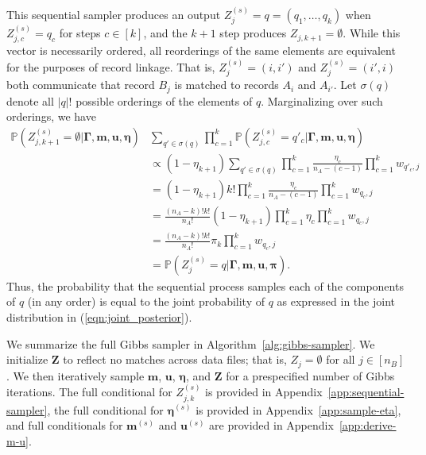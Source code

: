 \documentclass[12pt,letterpaper]{article}
\newcommand{\1}[1]{\mathbb{I}\!\left[#1\right]} %
\begin{document}
This sequential sampler produces an output $Z_j^{(s)} = q = (q_1, \ldots, q_k)$ when $Z_{j, c}^{(s)} = q_c$ for steps $c \in [k]$, and the $k+1$ step produces $Z_{j, k+1} = \emptyset$. While this vector is necessarily ordered, all reorderings of the same elements are equivalent for the purposes of record linkage.   That is, $Z_j^{(s)} = (i, i')$ and $Z_j^{(s)} = (i', i)$ both communicate that record $B_j$ is matched to records $A_i$ and $A_{i'}$. Let $\sigma(q)$ denote all $|q|!$ possible orderings of the elements of $q$. Marginalizing over such orderings, we have
\begin{align*}
	\mathbb{P}(Z_{j, k+1}^{(s)} = \emptyset | \bm{\Gamma}, \bm{m}, \bm{u}, \bm{\eta}) &\sum_{q' \in \sigma(q)} \prod_{c = 1}^{k} \mathbb{P}(Z_{j, c}^{(s)} = q'_c|\bm{\Gamma}, \bm{m}, \bm{u}, \bm{\eta}) \\
	&\propto (1 - \eta_{k+1}) \sum_{q' \in \sigma(q)} \prod_{c = 1}^{k} \frac{\eta_{c} }{n_A - (c - 1)}  \prod_{c = 1}^{k} w_{q'_c, j} \\
	&=(1 - \eta_{k+1}) k! \prod_{c = 1}^{k} \frac{\eta_{c} }{n_A - (c - 1)}  \prod_{c = 1}^{k} w_{q_c, j} \\
	&= \frac{(n_A - k)!k!}{n_A!} (1 - \eta_{k+1})\prod_{c = 1}^{k} \eta_{c} \prod_{c = 1}^{k} w_{q_c, j} \\
	&= \frac{(n_A - k)!k!}{n_A!} \pi_k \prod_{c = 1}^{k} w_{q_c, j} \\
	&= \mathbb{P}\left(Z_j^{(s)}  = q |\bm{\Gamma}, \bm{m}, \bm{u}, \bm{\pi}\right).
\end{align*}
Thus, the probability that the sequential process samples each of the components of $q$ (in any order) is equal to the joint probability of $q$ as expressed in the joint distribution in (\ref{eqn:joint_posterior}).

We summarize the full Gibbs sampler in Algorithm~\ref{alg:gibbs-sampler}. We initialize $\bm{Z}$ to reflect no matches across data files; that is, $Z_j = \emptyset$ for all $j \in [n_B]$. We then iteratively sample $\bm{m}$,  $\bm{u}$, $\bm{\eta}$, and $\bm{Z}$ for a prespecified number of Gibbs iterations. The full conditional for $Z_{j, k}^{(s)}$ is provided in Appendix~\ref{app:sequential-sampler}, the full conditional for $\bm{\eta}^{(s)}$ is provided in Appendix~\ref{app:sample-eta}, and full conditionals for $\bm{m}^{(s)}$ and $\bm{u}^{(s)}$ are provided in Appendix~\ref{app:derive-m-u}. 


\end{document}
